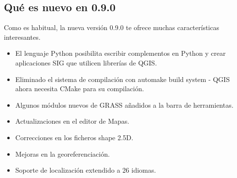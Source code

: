 \subsection{Qué es nuevo en 0.9.0}\label{label_whatsnew}

Como es habitual, la nueva versión 0.9.0 te ofrece muchas características 
interesantes.

\begin{itemize}
\item El lenguaje Python posibilita escribir complementos en Python y crear 
aplicaciones SIG que utilicen librerías de QGIS.
\item Eliminado el sistema de compilación con automake build system - QGIS ahora necesita CMake para su 
compilación.
\item Algunos módulos nuevos de GRASS añadidos a la barra de herramientas.
\item Actualizaciones en el editor de Mapas.
\item Correcciones en los ficheros shape 2.5D.
\item Mejoras en la georeferenciación.
\item Soporte de localización extendido a 26 idiomas.
\end{itemize}

